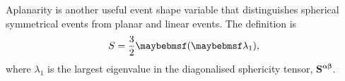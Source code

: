 Aplanarity is another useful event shape variable that distinguishes spherical symmetrical events from planar and linear events. The definition is
\begin{equation}
S = \frac{3}{2}\parenths{\lambda_{1}},
\end{equation}
where $\lambda_{1}$ is the largest eigenvalue in the diagonalised sphericity tensor, $\bm{S^{\alpha\beta}}$.

